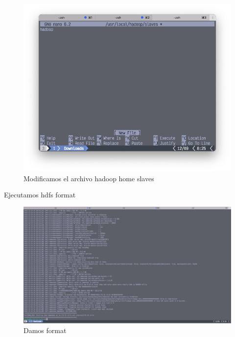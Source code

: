 \begin{figure}[h]
	\centering
	\includegraphics[scale=.35] {img/40-nano-hadoop_home-slaves}
	\caption{Modificamos el archivo hadoop home slaves}
	\label{fig:40}	
\end{figure}

Ejecutamos hdfs format
\begin{figure}[h]
	\centering
	\includegraphics[scale=.35] {img/41-hdfs-format}
	\caption{Damos format}
	\label{fig:41}	
\end{figure}

